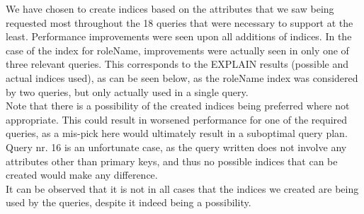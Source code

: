 We have chosen to create indices based on the attributes that we saw being requested most throughout the 18 queries that were necessary to support at the least. Performance improvements were seen upon all additions of indices. In the case of the index for roleName, improvements were actually seen in only one of three relevant queries. This corresponds to the EXPLAIN results (possible and actual indices used), as can be seen below, as the roleName index was considered by two queries, but only actually used in a single query.\\

Note that there is a possibility of the created indices being preferred where not appropriate. This could result in worsened performance for one of the required queries, as a mis-pick here would ultimately result in a suboptimal query plan.\\

Query nr. 16 is an unfortunate case, as the query written does not involve any attributes other than primary keys, and thus no possible indices that can be created would make any difference.\\

It can be observed that it is not in all cases that the indices we created are being used by the queries, despite it indeed being a possibility.